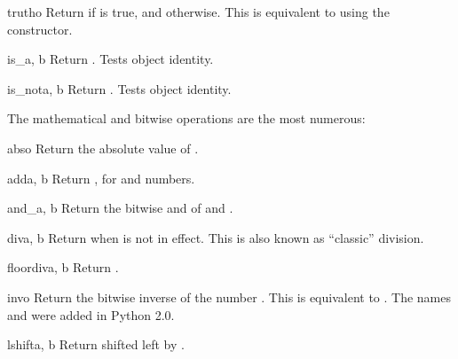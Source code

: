 \begin{funcdesc}{truth}{o}
Return  if  is true, and 
otherwise.  This is equivalent to using the 
constructor.
\end{funcdesc}

\begin{funcdesc}{is_}{a, b}
Return .  Tests object identity.
\end{funcdesc}

\begin{funcdesc}{is_not}{a, b}
Return .  Tests object identity.
\end{funcdesc}


The mathematical and bitwise operations are the most numerous:

\begin{funcdesc}{abs}{o}
Return the absolute value of .
\end{funcdesc}

\begin{funcdesc}{add}{a, b}
Return  \code{+} , for  and  numbers.
\end{funcdesc}

\begin{funcdesc}{and_}{a, b}
Return the bitwise and of  and .
\end{funcdesc}

\begin{funcdesc}{div}{a, b}
Return  \code{/}  when  is not
in effect.  This is also known as ``classic'' division.
\end{funcdesc}

\begin{funcdesc}{floordiv}{a, b}
Return  \code{//} .
\end{funcdesc}

\begin{funcdesc}{inv}{o}
Return the bitwise inverse of the number .  This is equivalent
to \code{\textasciitilde}.  The names  and
 were added in Python 2.0.
\end{funcdesc}

\begin{funcdesc}{lshift}{a, b}
Return  shifted left by .
\end{funcdesc}

